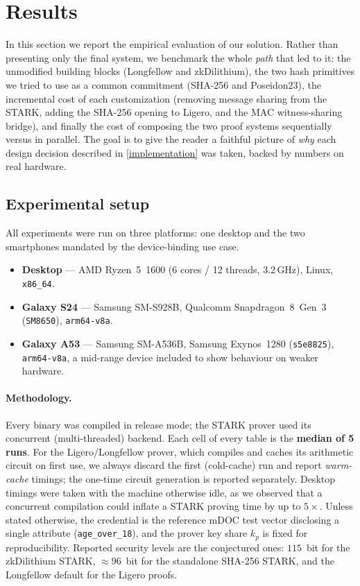 \documentclass{article}
\begin{document}
\section{Results}
\label{results}
In this section we report the empirical evaluation of our solution. Rather than
presenting only the final system, we benchmark the whole \emph{path} that led to
it: the unmodified building blocks (Longfellow and zkDilithium), the two hash
primitives we tried to use as a common commitment (SHA-256 and Poseidon23), the
incremental cost of each customization (removing message sharing from the STARK,
adding the SHA-256 opening to Ligero, and the MAC witness-sharing bridge), and
finally the cost of composing the two proof systems sequentially versus in
parallel. The goal is to give the reader a faithful picture of \emph{why} each
design decision described in \cref{implementation} was taken, backed by numbers
on real hardware.

\subsection{Experimental setup}
\label{results:setup}
All experiments were run on three platforms: one desktop and the two
smartphones mandated by the device-binding use case.
\begin{itemize}[noitemsep]
  \item \textbf{Desktop} --- AMD Ryzen~5~1600 (6 cores / 12 threads, 3.2\,GHz),
        Linux, \texttt{x86\_64}.
  \item \textbf{Galaxy S24} --- Samsung SM-S928B, Qualcomm Snapdragon~8~Gen~3
        (\texttt{SM8650}), \texttt{arm64-v8a}.
  \item \textbf{Galaxy A53} --- Samsung SM-A536B, Samsung Exynos~1280
        (\texttt{s5e8825}), \texttt{arm64-v8a}, a mid-range device included to
        show behaviour on weaker hardware.
\end{itemize}

\paragraph{Methodology.} Every binary was compiled in release mode; the STARK
prover used its concurrent (multi-threaded) backend. Each cell of every table is
the \textbf{median of 5 runs}. For the Ligero/Longfellow prover, which compiles
and caches its arithmetic circuit on first use, we always discard the first
(cold-cache) run and report \emph{warm-cache} timings; the one-time circuit
generation is reported separately. Desktop timings were taken with the machine
otherwise idle, as we observed that a concurrent compilation could inflate a
STARK proving time by up to $5\times$. Unless stated otherwise, the credential
is the reference mDOC test vector disclosing a single attribute
(\texttt{age\_over\_18}), and the prover key share $k_p$ is fixed for
reproducibility. Reported security levels are the conjectured ones: $115$~bit for
the zkDilithium STARK, ${\approx}96$~bit for the standalone SHA-256 STARK, and
the Longfellow default for the Ligero proofs.
\end{document}
